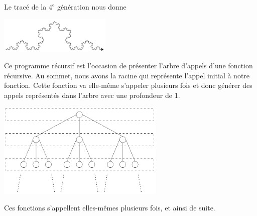 \documentclass{magnoliaold}
\begin{document}
Le tracé de la $4^e$ génération nous donne
\begin{center}
\includegraphics[width=0.4\textwidth]{../../commun/images/python-cours-koch-4}
\end{center}
Ce programme récursif est l'occasion de présenter l'arbre d'appels d'une fonction
récursive. Au sommet, nous avons la racine qui représente l'appel initial à notre
fonction. Cette fonction va elle-même s'appeler plusieurs fois et donc
générer des appels représentés dans l'arbre avec une profondeur de 1.
\begin{center}
\includegraphics[width=0.6\textwidth]{../../commun/images/python-cours-arbre-appel}
\end{center}
Ces fonctions s'appellent elles-mêmes plusieurs fois, et ainsi de suite.\\
\end{document}

